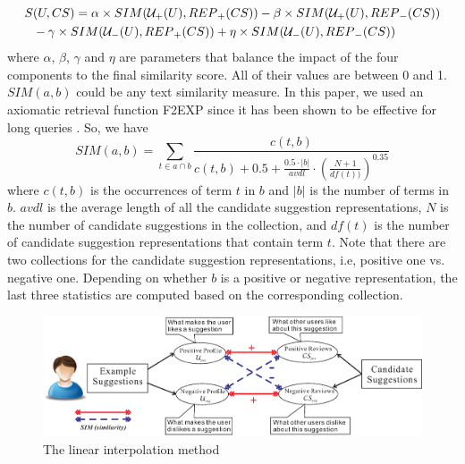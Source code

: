 \begin{equation}
\begin{split}
S&(U,CS) = \alpha \times SIM({\cal U}_{+}(U),{REP}_{+}(CS)) - \beta \times SIM({\cal U}_{+}(U),{REP}_{-}(CS)) \\
& - \gamma \times SIM({\cal U}_{-}(U),{REP}_{+}(CS)) + \eta \times SIM({\cal U}_{-}(U),{REP}_{-}(CS))
\end{split}
\label{eq:1}
\end{equation}
where $\alpha$, $\beta$, $\gamma$ and $\eta$ are parameters that balance the 
impact of the four components to the final similarity score. 
All of their values are between 0 and 1. 
$SIM(a,b)$ could be any text similarity measure. In this paper, 
we used an axiomatic retrieval function F2EXP 
\cite{Fang:2005:EAA:1076034.1076116} since it has been shown to be effective 
for long queries \cite{Fang:2005:EAA:1076034.1076116}. So, we have 
\begin{equation}
SIM(a,b)=\sum_{t\in{a\cap b}}{\frac{c(t,b)}{c(t,b)+0.5+\frac{0.5\cdot |b|}{avdl}\cdot (\frac{N+1}{df(t))})^{0.35}}}
\label{eq:f2exp}
\end{equation}
where
$c(t,b)$ is the occurrences of term $t$ in $b$ and $|b|$ is the number 
of terms in $b$. $avdl$ is the average length of all the candidate 
suggestion representations, $N$ is the number of candidate suggestions 
in the collection, and $df(t)$ is the number of candidate suggestion 
representations that contain term $t$. Note that there are two collections 
for the candidate suggestion representations, 
i.e, positive one vs. negative one.  
Depending on whether $b$ is a positive or negative representation, 
the last three statistics are computed based on the corresponding collection. 

\begin{figure}[t]
    \centering
    \includegraphics[width=1.0\textwidth]{figures/algorithm.eps}
    \caption{The linear interpolation method}
    \label{fig:algorithm}
\end{figure}


